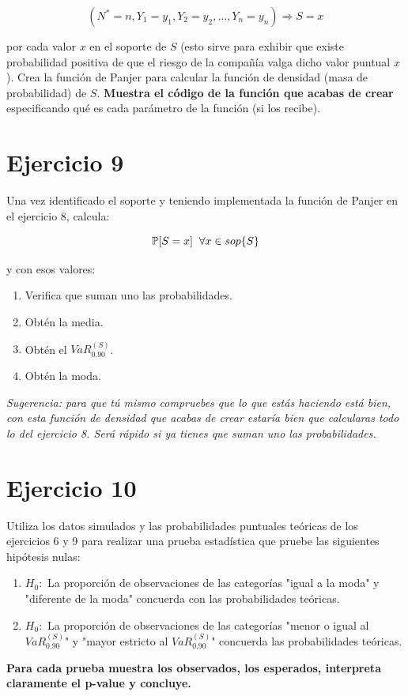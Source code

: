 \documentclass[
]{article}
\begin{document}
\[(N^*=n,Y_1=y_1,Y_2=y_2,\dots,Y_n=y_n) \Rightarrow S = x\]

por cada valor \(x\) en el soporte de \(S\) (esto sirve para exhibir que
existe probabilidad positiva de que el riesgo de la compañía valga dicho
valor puntual \(x\)). Crea la función de Panjer para calcular la función
de densidad (masa de probabilidad) de \(S\). \textbf{Muestra el código
de la función que acabas de crear} especificando qué es cada parámetro
de la función (si los recibe).

\hypertarget{ejercicio-9}{%
\section{Ejercicio 9}\label{ejercicio-9}}

Una vez identificado el soporte y teniendo implementada la función de
Panjer en el ejercicio 8, calcula:

\vspace{-0.3cm}

\[
\mathbb{P}[S=x] \hspace{0.2cm} \forall x\in sop\{S\}
\]

\vspace{-0.3cm}

y con esos valores:

\begin{enumerate}[label=(\alph*)]
\item Verifica que suman uno las probabilidades.
\item Obtén la media.
\item Obtén el $VaR_{0.90}^{(S)}$.
\item Obtén la moda.
\end{enumerate}

\emph{Sugerencia: para que tú mismo compruebes que lo que estás haciendo
está bien, con esta función de densidad que acabas de crear estaría bien
que calcularas todo lo del ejercicio 8. Será rápido si ya tienes que
suman uno las probabilidades.}

\hypertarget{ejercicio-10}{%
\section{Ejercicio 10}\label{ejercicio-10}}

Utiliza los datos simulados y las probabilidades puntuales teóricas de
los ejercicios 6 y 9 para realizar una prueba estadística que pruebe las
siguientes hipótesis nulas:

\begin{enumerate}[label=(\alph*)]
\item $H_0:$  La proporción de observaciones de las categorías "igual a la moda" y "diferente de la moda" concuerda con las probabilidades teóricas.
\item $H_0:$  La proporción de observaciones de las categorías "menor o igual al $VaR_{0.90}^{(S)}$" y "mayor estricto al $VaR_{0.90}^{(S)}$" concuerda las probabilidades teóricas.
\end{enumerate}

\textbf{Para cada prueba muestra los observados, los esperados,
interpreta claramente el p-value y concluye.}
\end{document}
